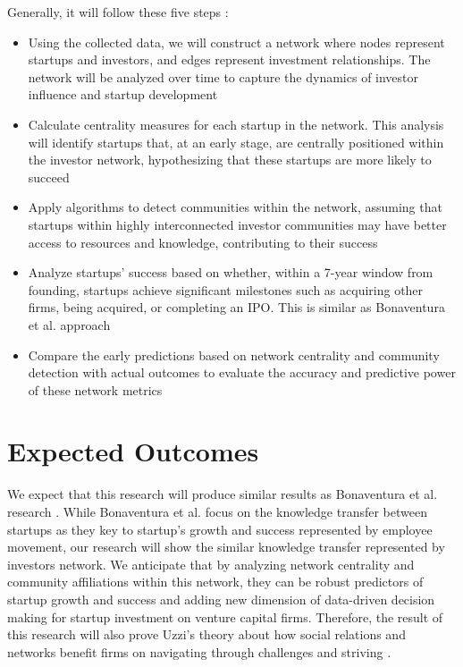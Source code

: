 \documentclass[a4paper,11pt]{article}
\begin{document}
Generally, it will follow these five steps : 
\begin{itemize}
    \item Using the collected data, we will construct a network where nodes represent startups and investors, and edges represent investment relationships. The network will be analyzed over time to capture the dynamics of investor influence and startup development
    \item Calculate centrality measures for each startup in the network. This analysis will identify startups that, at an early stage, are centrally positioned within the investor network, hypothesizing that these startups are more likely to succeed
    \item Apply algorithms to detect communities within the network, assuming that startups within highly interconnected investor communities may have better access to resources and knowledge, contributing to their success
    \item Analyze startups' success based on whether, within a 7-year window from founding, startups achieve significant milestones such as acquiring other firms, being acquired, or completing an IPO. This is similar as Bonaventura et al. approach \cite{bonaventura2020a}
    \item Compare the early predictions based on network centrality and community detection with actual outcomes to evaluate the accuracy and predictive power of these network metrics
\end{itemize}

\section{Expected Outcomes}
We expect that this research will produce similar results as Bonaventura et al. research \cite{bonaventura2020a}. While Bonaventura et al. focus on the knowledge transfer between startups as they key to startup's growth and success represented by employee movement, our research will show the similar knowledge transfer represented by investors network. We anticipate that by analyzing network centrality and community affiliations within this network, they can be robust predictors of startup growth and success and adding new dimension of data-driven decision making for startup investment on venture capital firms. Therefore, the result of this research will also prove Uzzi's theory about how social relations and networks benefit firms on navigating through challenges and striving \cite{uzzi2021a}.
\end{document}
